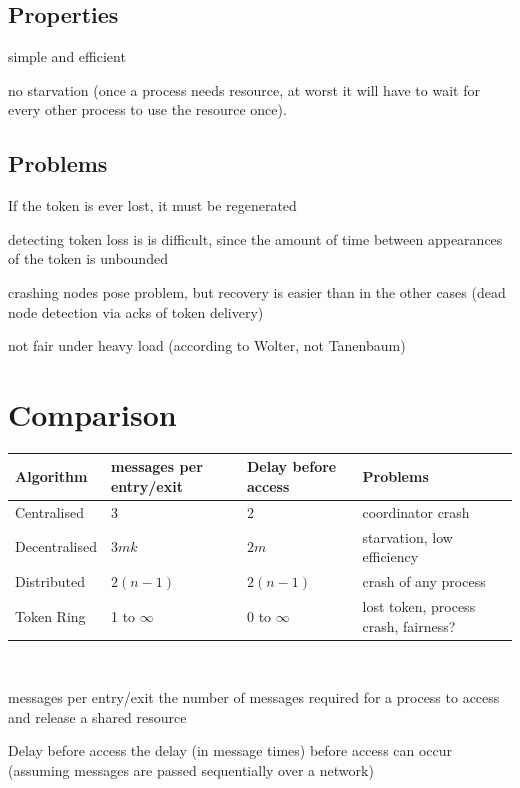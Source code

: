 \documentclass[ngerman,a4paper]{report}
\begin{document}
\subsection*{Properties}
\begin{compactitem}
	\item simple and efficient
	\item no starvation (once a process needs resource, at worst it will have to wait for every other process to use the resource once).
\end{compactitem}
\subsection*{Problems}
\begin{compactitem}
	\item If the token is ever lost, it must be regenerated
	\item detecting token loss is is difficult, since the amount of time between appearances of the token is unbounded
	\item crashing nodes pose problem, but recovery is easier than in the other cases (dead node detection via acks of token delivery)
	\item not fair under heavy load (according to Wolter, not Tanenbaum)
\end{compactitem}

\section{Comparison}

\begin{tabular} {l|l|l|l}
Algorithm&messages per entry/exit&Delay before access&Problems\\
\hline
Centralised& 3& 2&coordinator crash\\
Decentralised&$3mk$&$2m$&starvation, low efficiency\\
Distributed&$2(n-1)$&$2(n-1)$&crash of any process\\
Token Ring& 1 to $\infty$&$0$ to $\infty$&lost token, process crash, fairness?
\end{tabular}
\ \\
\begin{compactdesc}
	\item[messages per entry/exit] the number of messages required for a process to access and release a shared resource
	\item[Delay before access] the delay (in message times) before access can occur (assuming messages are passed sequentially over a network)
\end{compactdesc}
\end{document}

